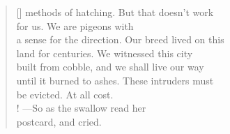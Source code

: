 \documentclass{book}
\begin{document}
\begin{verse}[\versewidth]
    methods of hatching. But that doesn't work\\
    for us. We are pigeons with\\
    a sense for the direction. Our breed lived on this \\
    land for centuries. We witnessed this city\\
    built from cobble, and we shall live our way\\
    until it burned to ashes. These intruders must\\
    be evicted. At all cost. \\! 
    ---So as the swallow read her \\
    postcard, and cried.
\end{verse}

\newpage
\poemtitle{\textcolor[RGB]{175,25,25}{Hyposomnia Hypothesis}}
\hspace*{\fill} \\
\settowidth{\versewidth}{an aerial shot. An endless road extents to the clouds.}
\end{document}
